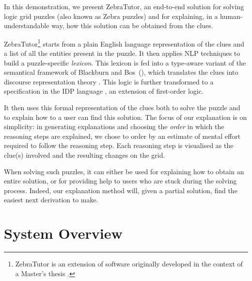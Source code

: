 \documentclass[runningheads]{llncs}
\newcommand{\zebratutor}{ZebraTutor\xspace}
\newcommand{\ourtool}{\zebratutor}
\newcommand{\idp}{IDP\xspace}
\newcommand{\minisatid}{MiniSAT(ID)\xspace}
\newcommand{\mycite}[1]{\cite{#1}}
\begin{document}
In this demonstration, we present \ourtool,  an end-to-end solution for solving logic grid puzzles (also known as Zebra puzzles) and for explaining, in a human-understandable way, how this solution can be obtained from the clues. 

\ourtool\footnote{\ourtool is an extension of software originally developed in the context of a Master's thesis \cite{msc/Claes17}.} starts from a plain English language representation of the clues and a list of all the entities present in the puzzle. It then applies NLP techniques to build a puzzle-specific \textit{lexicon}. This lexicon is fed into a type-aware variant of the semantical framework of Blackburn and Bos~(\cite{Blackburn2005,Blackburn2006}), which translates the clues into discourse representation theory \cite{DRT}. This logic is further transformed to a specification in the \idp language \mycite{WarrenBook/DeCatBBD14}, an extension of first-order logic. 

It then uses this formal representation of the clues both to solve the puzzle and to explain how to a user can find this solution. 
The focus of our explanation is on simplicity: 
in generating explanations and choosing the \textit{order} in which the reasoning steps are explained, we chose to order by an estimate of mental effort required to follow the reasoning step. Each reasoning step is visualised as the clue(s) involved and the resulting changes on the grid.

When solving such puzzles, it can either be used for explaining how to obtain an entire solution, or for providing help to users who are stuck during the solving process. Indeed, our explanation method will, given a partial solution, find the easiest next derivation to make. 


\section{System Overview}
\end{document}
